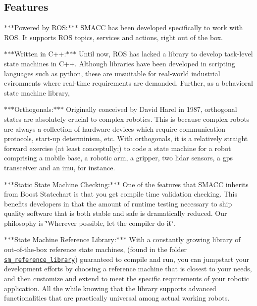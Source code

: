 \subsection*{Features}


\begin{DoxyItemize}
\item $\ast$$\ast$$\ast$\+Powered by R\+OS\+:$\ast$$\ast$$\ast$ S\+M\+A\+CC has been developed specifically to work with R\+OS. It supports R\+OS topics, services and actions, right out of the box.
\item $\ast$$\ast$$\ast$\+Written in C++\+:$\ast$$\ast$$\ast$ Until now, R\+OS has lacked a library to develop task-\/level state machines in C++. Although libraries have been developed in scripting languages such as python, these are unsuitable for real-\/world industrial evironments where real-\/time requirements are demanded. Further, as a behavioral state machine library,
\item $\ast$$\ast$$\ast$\+Orthogonals\+:$\ast$$\ast$$\ast$ Originally conceived by David Harel in 1987, orthogonal states are absolutely crucial to complex robotics. This is because complex robots are always a collection of hardware devices which require communication protocols, start-\/up determinism, etc. With orthogonals, it is a relatively straight forward exercise (at least conceptully;) to code a state machine for a robot comprising a mobile base, a robotic arm, a gripper, two lidar sensors, a gps transceiver and an imu, for instance.
\item $\ast$$\ast$$\ast$\+Static State Machine Checking\+:$\ast$$\ast$$\ast$ One of the features that S\+M\+A\+CC inherits from Boost Statechart is that you get compile time validation checking. This benefits developers in that the amount of runtime testing necessary to ship quality software that is both stable and safe is dramatically reduced. Our philosophy is \char`\"{}\+Wherever possible, let the compiler do it\char`\"{}.
\item $\ast$$\ast$$\ast$\+State Machine Reference Library\+:$\ast$$\ast$$\ast$ With a constantly growing library of out-\/of-\/the-\/box reference state machines, (found in the folder \href{https://github.com/reelrbtx/SMACC/tree/master/smacc_sm_reference_library}{\tt sm\+\_\+reference\+\_\+library}) guaranteed to compile and run, you can jumpstart your development efforts by choosing a reference machine that is closest to your needs, and then customize and extend to meet the specific requirements of your robotic application. All the while knowing that the library supports advanced functionalities that are practically universal among actual working robots.

\end{DoxyItemize}
